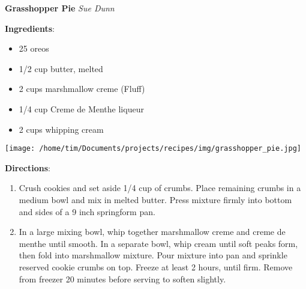 \documentclass[11pt, twoside, openany]{book}
\begin{document}
\noindent\begin{minipage}[t]{\linewidth}%
{\Large\textbf{Grasshopper Pie}} \label{grasshopper-pie}\hfill\textit{Sue Dunn}\\
\noindent\begin{minipage}[t]{0.78\linewidth}%
\textbf{Ingredients}:\vspace{-3mm}
\begin{multicols}{2}
\begin{itemize}\setlength\itemsep{-1mm}
\item 25 oreos
\item 1/2 cup butter, melted
\item 2 cups marshmallow creme (Fluff)
\item 1/4 cup Creme de Menthe liqueur
\item 2 cups whipping cream
\end{itemize}
\end{multicols}
\end{minipage}
\noindent\begin{minipage}[t]{0.18\linewidth}
\centering \strut\vspace*{-\baselineskip}\newline
\texttt{[image: /home/tim/Documents/projects/recipes/img/grasshopper\_pie.jpg]}\\
\end{minipage}\vspace{3mm}
\textbf{Directions}:
\vspace{-3mm}\begin{enumerate}\setlength\itemsep{-1mm}
\item Crush cookies and set aside 1/4 cup of crumbs. Place remaining crumbs in a medium bowl and mix in melted butter. Press mixture firmly into bottom and sides of a 9 inch springform pan.
\item In a large mixing bowl, whip together marshmallow creme and creme de menthe until smooth. In a separate bowl, whip cream until soft peaks form, then fold into marshmallow mixture. Pour mixture into pan and sprinkle reserved cookie crumbs on top. Freeze at least 2 hours, until firm. Remove from freezer 20 minutes before serving to soften slightly.
\end{enumerate}
\end{minipage}\vspace{8mm}
\end{document}
